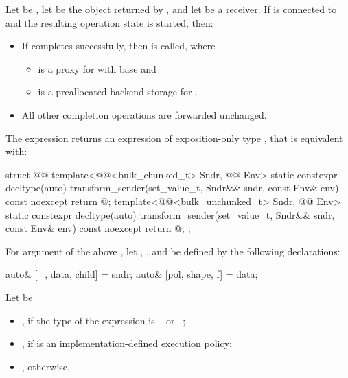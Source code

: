 \pnum
Let  be ,
let  be the object returned by , and
let  be a receiver.
If  is connected to  and
the resulting operation state is started, then:
\begin{itemize}
\item
If  completes successfully,
then  is called, where
\begin{itemize}
\item
{} is a proxy for 
with base  and
\item
{} is a preallocated backend storage for .
\end{itemize}
\item
All other completion operations are forwarded unchanged.
\end{itemize}

\pnum
The expression 
returns an expression of exposition-only type
, that is equivalent with:

\begin{codeblock}
struct @@ {
  template<@@<bulk_chunked_t> Sndr, @@ Env>
  static constexpr decltype(auto)
    transform_sender(set_value_t, Sndr&& sndr, const Env& env) const noexcept {
      return @\seebelow@;
    }
  template<@@<bulk_unchunked_t> Sndr, @@ Env>
  static constexpr decltype(auto)
    transform_sender(set_value_t, Sndr&& sndr, const Env& env) const noexcept {
      return @\seebelow@;
    }
};
\end{codeblock}

\pnum
For argument  of the above ,
let , ,  and 
be defined by the following declarations:
\begin{codeblock}
auto& [_, data, child] = sndr;
auto& [pol, shape, f] = data;
\end{codeblock}

\pnum
Let  be
\begin{itemize}
\item
{}, if the type of the expression  is
\cv{}~ or \cv{}~;
\item
{},
if  is an implementation-defined execution policy;
\item
{}, otherwise.
\end{itemize}

